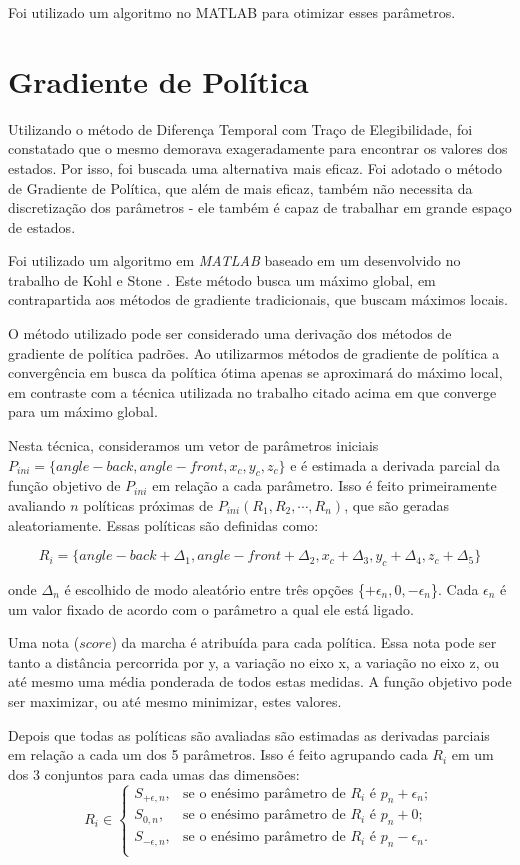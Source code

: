 \documentclass[12pt]{report}
\begin{document}
Foi utilizado um algoritmo no MATLAB \cite{11} para otimizar esses parâmetros.

\section*{Gradiente de Política}

Utilizando o método de Diferença Temporal com Traço de Elegibilidade, foi constatado que o mesmo demorava exageradamente para encontrar os valores dos estados. Por isso, foi buscada uma alternativa mais eficaz. Foi adotado o método de Gradiente de Política, que além de mais eficaz, também não necessita da discretização dos parâmetros - ele também é capaz de trabalhar em grande espaço de estados.

Foi utilizado um algoritmo em \emph{MATLAB} baseado em um desenvolvido no trabalho de Kohl e Stone \cite{12}. Este método busca um máximo global, em contrapartida aos métodos de gradiente tradicionais, que buscam máximos locais.

O método utilizado pode ser considerado uma derivação dos métodos de gradiente de política padrões. Ao utilizarmos métodos de gradiente de política a convergência em busca da política ótima apenas se aproximará do máximo local, em contraste com a técnica utilizada no trabalho citado acima em que converge para um máximo global.

Nesta técnica, consideramos um vetor de parâmetros iniciais $P_{ini} = \{angle-back, angle-front, x_{c}, y_{c}, z_{c}\}$ e é estimada a derivada parcial da função objetivo de $P_{ini}$ em relação a cada parâmetro. Isso é feito primeiramente avaliando $n$ políticas próximas de $P_{ini}(R_1, R_2, \cdots , R_n)$, que são geradas aleatoriamente. Essas políticas são definidas como:

$$R_i = \{angle-back+\Delta_1 , angle-front+\Delta_2, x_c+\Delta_3, y_c+\Delta_4, z_c+\Delta_5\}$$

onde $\Delta_n$ é escolhido de modo aleatório entre três opções \{$+\epsilon_n ,0, -\epsilon_n$\}. Cada $\epsilon_n$ é um valor fixado de acordo com o parâmetro a qual ele está ligado. 

Uma nota ($score$) da marcha é atribuída para cada política. Essa nota pode ser tanto a distância percorrida por y, a variação no eixo x, a variação no eixo z, ou até mesmo uma média ponderada de todos estas medidas. A função objetivo pode ser maximizar, ou até mesmo minimizar, estes valores. 

Depois que todas as políticas são avaliadas são estimadas as derivadas parciais em relação a cada um dos 5 parâmetros. Isso é feito agrupando cada $R_i$ em um dos 3 conjuntos para cada umas das dimensões:
$$R_i \in \left \{
\begin{array}{ll}
S_{+\epsilon,n}, & \text{se o enésimo parâmetro de $R_i$ é $p_n + \epsilon_n$};\\
S_{0,n}, & \text{se o enésimo parâmetro de $R_i$ é $p_n + 0$};\\
S_{-\epsilon,n}, & \text{se o enésimo parâmetro de $R_i$ é $p_n -  \epsilon_n$}.\\
\end{array}
\right.$$
\end{document}

